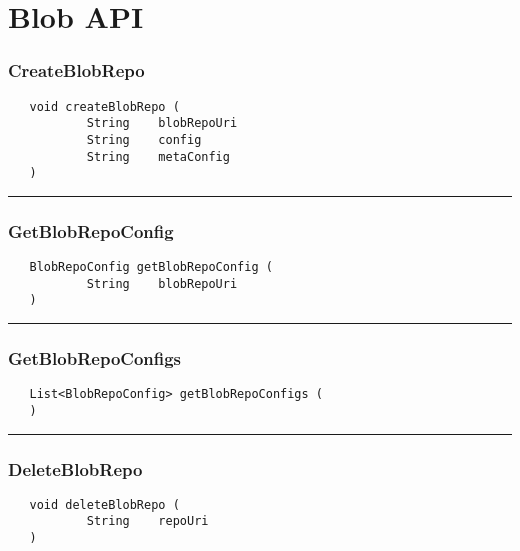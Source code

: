 \chapter{Blob API}

\subsection{CreateBlobRepo}
\label{Api:CreateBlobRepo}
\begin{verbatim}
   void createBlobRepo (
           String    blobRepoUri
           String    config
           String    metaConfig
   )
\end{verbatim}



\rule{15cm}{2pt}
\subsection{GetBlobRepoConfig}
\label{Api:GetBlobRepoConfig}
\begin{verbatim}
   BlobRepoConfig getBlobRepoConfig (
           String    blobRepoUri
   )
\end{verbatim}



\rule{15cm}{2pt}
\subsection{GetBlobRepoConfigs}
\label{Api:GetBlobRepoConfigs}
\begin{verbatim}
   List<BlobRepoConfig> getBlobRepoConfigs (
   )
\end{verbatim}



\rule{15cm}{2pt}
\subsection{DeleteBlobRepo}
\label{Api:DeleteBlobRepo}
\begin{verbatim}
   void deleteBlobRepo (
           String    repoUri
   )
\end{verbatim}



